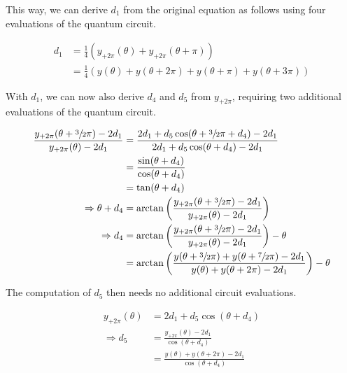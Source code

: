 This way, we can derive $d_1$ from the original equation as follows using four
evaluations of the quantum circuit.

\begin{equation}
    \label{eq:d1}
    \begin{split}
        d_1
            &= \frac14 (y_{+2\pi}(\theta) + y_{+2\pi}(\theta + \pi)) \\
            &= \frac14 (y(\theta) + y(\theta + 2\pi) + y(\theta + \pi) + y(\theta + 3\pi))
    \end{split}
\end{equation}

With $d_1$, we can now also derive $d_4$ and $d_5$ from $y_{+2\pi}$, requiring
two additional evaluations of the quantum circuit.

\begin{equation}
    \label{eq:d4}
    \begin{split}
        \frac{y_{+2\pi}(\theta + \sfrac32 \pi) - 2 d_1}{y_{+2\pi}(\theta) - 2 d_1}
            &= \frac{2 d_1 + d_5 \cos(\theta + \sfrac32 \pi + d_4) - 2 d_1}{2 d_1 + d_5 \cos(\theta + d_4) - 2 d_1} \\
            &= \frac{\sin(\theta + d_4)}{\cos(\theta + d_4)} \\
            &= \tan(\theta + d_4) \\
        \Rightarrow \theta + d_4
            &= \arctan\left(\frac{y_{+2\pi}(\theta + \sfrac32 \pi) - 2 d_1}{y_{+2\pi}(\theta) - 2 d_1}\right) \\
        \Rightarrow d_4
            &= \arctan\left(\frac{y_{+2\pi}(\theta + \sfrac32 \pi) - 2 d_1}{y_{+2\pi}(\theta) - 2 d_1}\right) - \theta \\
            &= \arctan\left(\frac{y(\theta + \sfrac32 \pi) + y(\theta + \sfrac72 \pi) - 2 d_1}{y(\theta) + y(\theta + 2\pi) - 2 d_1}\right) - \theta
    \end{split}
\end{equation}

The computation of $d_5$ then needs no additional circuit evaluations.

\begin{equation}
    \label{eq:d5}
    \begin{split}
        y_{+2\pi}(\theta)
            &= 2 d_1 + d_5 \cos(\theta + d_4) \\
        \Rightarrow d_5
            &= \frac{y_{+2\pi}(\theta) - 2 d_1}{\cos(\theta + d_4)} \\
            &= \frac{y(\theta) + y(\theta + 2\pi) - 2 d_1}{\cos(\theta + d_4)}
    \end{split}
\end{equation}

